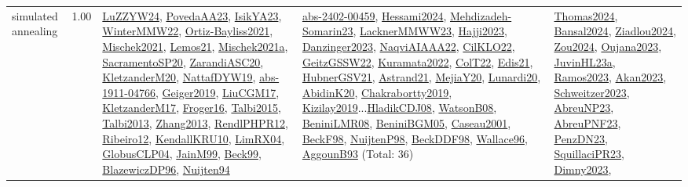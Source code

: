 {\begin{longtable}{p{3cm}r>{\raggedright\arraybackslash}p{6cm}>{\raggedright\arraybackslash}p{6cm}>{\raggedright\arraybackslash}p{8cm}}
\index{simulated annealing}\index{Algorithms!simulated annealing}simulated annealing &  1.00 & \hyperref[detail:LuZZYW24]{LuZZYW24}, \hyperref[detail:PovedaAA23]{PovedaAA23}, \hyperref[detail:IsikYA23]{IsikYA23}, \hyperref[detail:WinterMMW22]{WinterMMW22}, \hyperref[detail:Ortiz-Bayliss2021]{Ortiz-Bayliss2021}, \hyperref[detail:Mischek2021]{Mischek2021}, \hyperref[detail:Lemos21]{Lemos21}, \hyperref[detail:Mischek2021a]{Mischek2021a}, \hyperref[detail:SacramentoSP20]{SacramentoSP20}, \hyperref[detail:ZarandiASC20]{ZarandiASC20}, \hyperref[detail:KletzanderM20]{KletzanderM20}, \hyperref[detail:NattafDYW19]{NattafDYW19}, \hyperref[detail:abs-1911-04766]{abs-1911-04766}, \hyperref[detail:Geiger2019]{Geiger2019}, \hyperref[detail:LiuCGM17]{LiuCGM17}, \hyperref[detail:KletzanderM17]{KletzanderM17}, \hyperref[detail:Froger16]{Froger16}, \hyperref[detail:Talbi2015]{Talbi2015}, \hyperref[detail:Talbi2013]{Talbi2013}, \hyperref[detail:Zhang2013]{Zhang2013}, \hyperref[detail:RendlPHPR12]{RendlPHPR12}, \hyperref[detail:Ribeiro12]{Ribeiro12}, \hyperref[detail:KendallKRU10]{KendallKRU10}, \hyperref[detail:LimRX04]{LimRX04}, \hyperref[detail:GlobusCLP04]{GlobusCLP04}, \hyperref[detail:JainM99]{JainM99}, \hyperref[detail:Beck99]{Beck99}, \hyperref[detail:BlazewiczDP96]{BlazewiczDP96}, \hyperref[detail:Nuijten94]{Nuijten94} & \hyperref[detail:abs-2402-00459]{abs-2402-00459}, \hyperref[detail:Hessami2024]{Hessami2024}, \hyperref[detail:Mehdizadeh-Somarin23]{Mehdizadeh-Somarin23}, \hyperref[detail:LacknerMMWW23]{LacknerMMWW23}, \hyperref[detail:Hajji2023]{Hajji2023}, \hyperref[detail:Danzinger2023]{Danzinger2023}, \hyperref[detail:NaqviAIAAA22]{NaqviAIAAA22}, \hyperref[detail:CilKLO22]{CilKLO22}, \hyperref[detail:GeitzGSSW22]{GeitzGSSW22}, \hyperref[detail:Kuramata2022]{Kuramata2022}, \hyperref[detail:ColT22]{ColT22}, \hyperref[detail:Edis21]{Edis21}, \hyperref[detail:HubnerGSV21]{HubnerGSV21}, \hyperref[detail:Astrand21]{Astrand21}, \hyperref[detail:MejiaY20]{MejiaY20}, \hyperref[detail:Lunardi20]{Lunardi20}, \hyperref[detail:AbidinK20]{AbidinK20}, \hyperref[detail:Chakrabortty2019]{Chakrabortty2019}, \hyperref[detail:Kizilay2019]{Kizilay2019}...\hyperref[detail:HladikCDJ08]{HladikCDJ08}, \hyperref[detail:WatsonB08]{WatsonB08}, \hyperref[detail:BeniniLMR08]{BeniniLMR08}, \hyperref[detail:BeniniBGM05]{BeniniBGM05}, \hyperref[detail:Caseau2001]{Caseau2001}, \hyperref[detail:BeckF98]{BeckF98}, \hyperref[detail:NuijtenP98]{NuijtenP98}, \hyperref[detail:BeckDDF98]{BeckDDF98}, \hyperref[detail:Wallace96]{Wallace96}, \hyperref[detail:AggounB93]{AggounB93} (Total: 36) & \hyperref[detail:Thomas2024]{Thomas2024}, \hyperref[detail:Bansal2024]{Bansal2024}, \hyperref[detail:Ziadlou2024]{Ziadlou2024}, \hyperref[detail:Zou2024]{Zou2024}, \hyperref[detail:Oujana2023]{Oujana2023}, \hyperref[detail:JuvinHL23a]{JuvinHL23a}, \hyperref[detail:Ramos2023]{Ramos2023}, \hyperref[detail:Akan2023]{Akan2023}, \hyperref[detail:Schweitzer2023]{Schweitzer2023}, \hyperref[detail:AbreuNP23]{AbreuNP23}, \hyperref[detail:AbreuPNF23]{AbreuPNF23}, \hyperref[detail:PenzDN23]{PenzDN23}, \hyperref[detail:SquillaciPR23]{SquillaciPR23}, \hyperref[detail:Dimny2023]{Dimny2023}, 
\end{longtable}}

